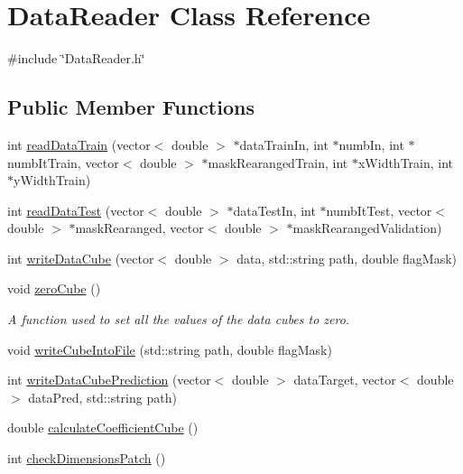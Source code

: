 \hypertarget{classDataReader}{}\section{Data\+Reader Class Reference}
\label{classDataReader}


{\ttfamily \#include \char`\"{}Data\+Reader.\+h\char`\"{}}

\subsection*{Public Member Functions}
\begin{DoxyCompactItemize}
\item 
int \hyperlink{classDataReader_a3af651bdeb6b8613b5c1e5c20d135fee}{read\+Data\+Train} (vector$<$ double $>$ $\ast$data\+Train\+In, int $\ast$numb\+In, int $\ast$numb\+It\+Train, vector$<$ double $>$ $\ast$mask\+Rearanged\+Train, int $\ast$x\+Width\+Train, int $\ast$y\+Width\+Train)
\item 
int \hyperlink{classDataReader_a9816af31c4b15b59379622346d3782f7}{read\+Data\+Test} (vector$<$ double $>$ $\ast$data\+Test\+In, int $\ast$numb\+It\+Test, vector$<$ double $>$ $\ast$mask\+Rearanged, vector$<$ double $>$ $\ast$mask\+Rearanged\+Validation)
\item 
int \hyperlink{classDataReader_adc671d5bc1196eb8a99b37d7f87440de}{write\+Data\+Cube} (vector$<$ double $>$ data, std\+::string path, double flag\+Mask)
\item 
void \hyperlink{classDataReader_af0251b5edd10a372d9f30a836472357f}{zero\+Cube} ()
\begin{DoxyCompactList}\small\item\em A function used to set all the values of the data cubes to zero. \end{DoxyCompactList}\item 
void \hyperlink{classDataReader_a3cbc317ede9f646ec01f5cacf90781a0}{write\+Cube\+Into\+File} (std\+::string path, double flag\+Mask)
\item 
int \hyperlink{classDataReader_aa2f408b750df89a6d6ab2a0ce286a914}{write\+Data\+Cube\+Prediction} (vector$<$ double $>$ data\+Target, vector$<$ double $>$ data\+Pred, std\+::string path)
\item 
double \hyperlink{classDataReader_a22c2992f3d00c30f9b53e46a6a38571f}{calculate\+Coefficient\+Cube} ()
\item 
int \hyperlink{classDataReader_ae6645eba51e680bd59cc3c9fe297e5b5}{check\+Dimensions\+Patch} ()

\end{DoxyCompactItemize}
